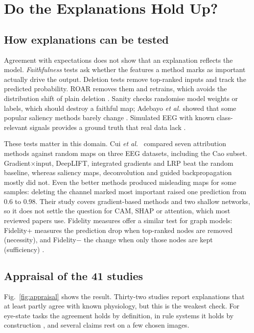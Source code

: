 \section{Do the Explanations Hold Up?}
\label{sec:evaluation}

\subsection{How explanations can be tested}
Agreement with expectations does not show that an explanation reflects the model. \textit{Faithfulness} tests ask whether the features a method marks as important actually drive the output. Deletion tests remove top-ranked inputs and track the predicted probability. ROAR removes them and retrains, which avoids the distribution shift of plain deletion \cite{hooker2019benchmark}. Sanity checks randomise model weights or labels, which should destroy a faithful map; Adebayo \textit{et al.} showed that some popular saliency methods barely change \cite{adebayo2018sanity}. Simulated EEG with known class-relevant signals provides a ground truth that real data lack \cite{ravindran2023empirical}.

These tests matter in this domain. Cui \textit{et al.}~\cite{cui2023towards} compared seven attribution methods against random maps on three EEG datasets, including the Cao subset. Gradient$\times$input, DeepLIFT, integrated gradients and LRP beat the random baseline, whereas saliency maps, deconvolution and guided backpropagation mostly did not. Even the better methods produced misleading maps for some samples: deleting the channel marked most important raised one prediction from 0.6 to 0.98. Their study covers gradient-based methods and two shallow networks, so it does not settle the question for CAM, SHAP or attention, which most reviewed papers use. Fidelity measures offer a similar test for graph models: Fidelity+ measures the prediction drop when top-ranked nodes are removed (necessity), and Fidelity$-$ the change when only those nodes are kept (sufficiency) \cite{zeynalpour2025multimethod}.

\subsection{Appraisal of the 41 studies}
Fig.~\ref{fig:appraisal} shows the result. Thirty-two studies report explanations that at least partly agree with known physiology, but this is the weakest check. For eye-state tasks the agreement holds by definition, in rule systems it holds by construction \cite{georgiadis2026timeaware,hu2026human,yan2026toward}, and several claims rest on a few chosen images.


